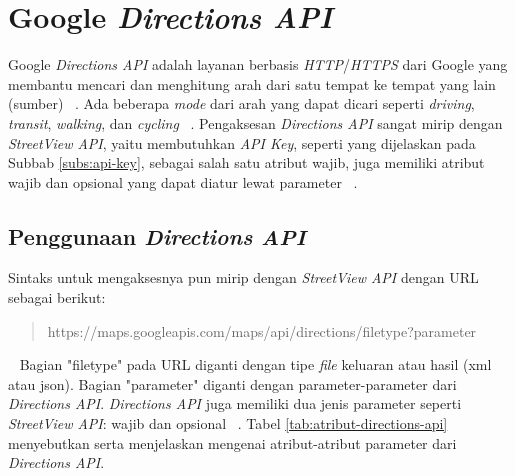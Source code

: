 \section{Google {\it Directions API}}
\label{sec:directions}
Google {\it Directions API} adalah layanan berbasis \textit{HTTP}/\textit{HTTPS} dari Google yang membantu mencari dan menghitung arah dari satu tempat ke tempat yang lain (sumber) ~\cite{directions-api}. Ada beberapa \textit{mode} dari arah yang dapat dicari seperti {\it driving}, {\it transit}, {\it walking}, dan {\it cycling} ~\cite{directions-api}. Pengaksesan \textit{Directions API} sangat mirip dengan {\it StreetView API}, yaitu membutuhkan \textit{API Key}, seperti yang dijelaskan pada Subbab \ref{subs:api-key}, sebagai salah satu atribut wajib, juga memiliki atribut wajib dan opsional yang dapat diatur lewat parameter ~\cite{directions-api}. 

\subsection{Penggunaan {\it Directions API}}
Sintaks untuk mengaksesnya pun mirip dengan \textit{StreetView API} dengan URL sebagai berikut:
\begin{quote}
https://maps.googleapis.com/maps/api/directions/filetype?parameter
\end{quote} ~\cite{directions-api}
Bagian "filetype" pada URL diganti dengan tipe \textit{file} keluaran atau hasil (xml atau json). Bagian "parameter" diganti dengan parameter-parameter dari {\it Directions API}.  {\it Directions API} juga memiliki dua jenis parameter seperti {\it StreetView API}: wajib dan opsional ~\cite{directions-api}. Tabel \ref{tab:atribut-directions-api} menyebutkan serta menjelaskan mengenai atribut-atribut parameter dari \textit{Directions API}.

